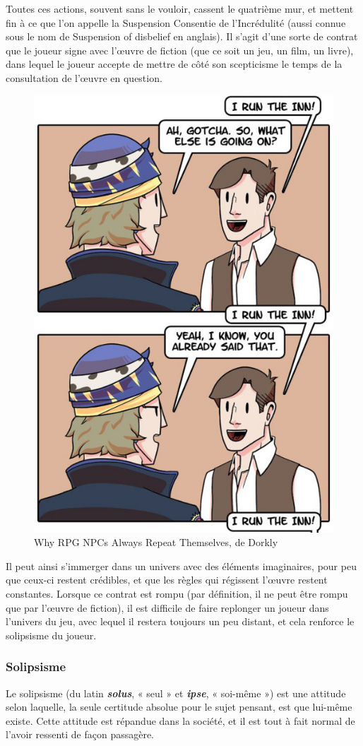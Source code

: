 \documentclass[a4paper, 12pt]{article} %
\begin{document}
Toutes ces actions, souvent sans le vouloir, cassent le quatrième mur, et mettent fin à ce que l’on appelle la Suspension Consentie de l’Incrédulité (aussi connue sous le nom de Suspension of disbelief en anglais). Il s’agit d’une sorte de contrat que le joueur signe avec l’œuvre de fiction (que ce soit un jeu, un film, un livre), dans lequel le joueur accepte de mettre de côté son scepticisme le temps de la consultation de l’œuvre en question. 

\begin{figure}[!h]%
	\begin{center} 
		\includegraphics[width=0.42\columnwidth]{images/repeat2.png}%
		\caption{Why RPG NPCs Always Repeat Themselves, de Dorkly}%
	\end{center}
\end{figure}

Il peut ainsi s’immerger dans un univers avec des éléments imaginaires, pour peu que ceux-ci restent crédibles, et que les règles qui régissent l’œuvre restent constantes.
Lorsque ce contrat est rompu (par définition, il ne peut être rompu que par l’œuvre de fiction), il est difficile de faire replonger un joueur dans l’univers du jeu, avec lequel il restera toujours un peu distant, et cela renforce le solipsisme du joueur.

\newpage
\subsubsection{Solipsisme}

Le solipsisme (du latin \textbf{\textit{solus}}, « seul » et \textbf{\textit{ipse}}, « soi-même ») est une attitude selon laquelle, la seule certitude absolue pour le sujet pensant, est que lui-même existe. Cette attitude est répandue dans la société, et il est tout à fait normal de l’avoir ressenti de façon passagère.
\end{document}

